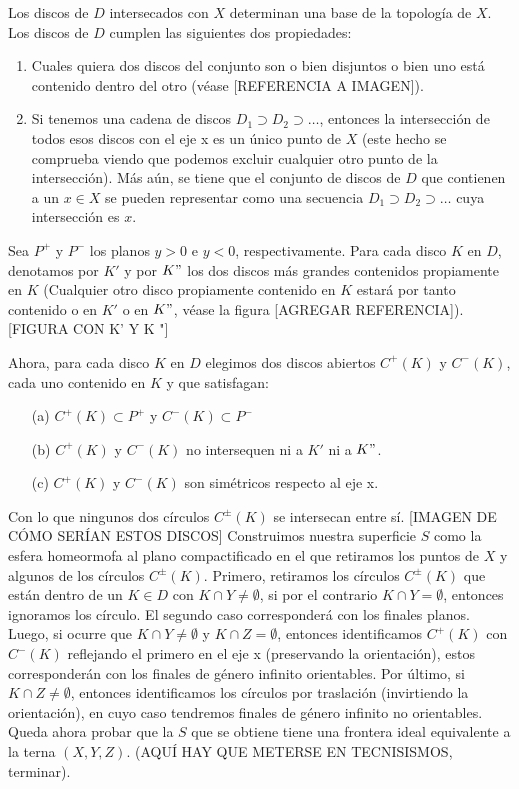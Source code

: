 \documentclass[a4paper,11pt,spanish, twoside, leqno]{tfg-uam}
\theoremstyle{definition}
\begin{document}
Los discos de $D$ intersecados con $X$ determinan una base de la topología de $X$. Los discos de $D$ cumplen las siguientes dos propiedades:
\begin{enumerate}
\item Cuales quiera dos discos del conjunto son o bien disjuntos o bien uno está contenido dentro del otro (véase [REFERENCIA A IMAGEN]).
\item Si tenemos una cadena de discos $D_1 \supset D_2 \supset \ldots$, entonces la intersección de todos esos discos  con el eje x es un único punto de $X$ (este hecho se comprueba viendo que podemos excluir cualquier otro punto de la intersección). Más aún, se tiene que el conjunto de discos de $D$ que contienen a un $x \in X$ se pueden representar como una secuencia $D_1 \supset D_2 \supset \ldots$ cuya intersección es $x$.
\end{enumerate}
Sea $P^+$ y $P^-$ los planos $y > 0 $ e $y < 0$, respectivamente. Para cada disco $K$ en $D$, denotamos por $K'$ y por $K"$ los dos discos más grandes contenidos propiamente en $K$ (Cualquier otro disco propiamente contenido en $K$ estará por tanto contenido o en $K'$ o en $K"$, véase la figura [AGREGAR REFERENCIA]).
[FIGURA CON K' Y K "]

Ahora, para cada disco $K$ en $D$ elegimos dos discos abiertos $C^+(K)$ y $C^-(K)$, cada uno contenido en $K$  y que satisfagan:
\begin{enumerate}
\item[(a)] $C^+(K) \subset P^+$ y $C^-(K) \subset P^-$
\item[(b)] $C^+(K)$ y $C^-(K)$ no intersequen ni a $K'$ ni a $K"$.
\item[(c)] $C^+(K)$ y $C^-(K)$ son simétricos respecto al eje x.
\end{enumerate}
Con lo que ningunos dos círculos $C^\pm(K)$ se intersecan entre sí.
[IMAGEN DE CÓMO SERÍAN ESTOS DISCOS]
Construimos nuestra superficie $S$ como la esfera homeormofa al plano compactificado en el que retiramos los puntos de $X$ y algunos de los círculos $C^\pm(K)$. Primero, retiramos los círculos $C^\pm(K)$ que están dentro de un $K\in D$ con $K \cap Y \neq \emptyset$, si por el contrario  $K \cap Y = \emptyset$, entonces ignoramos los círculo. El segundo caso corresponderá con los finales planos. Luego,  si ocurre que $K \cap Y \neq \emptyset$  y $K \cap Z = \emptyset$, entonces identificamos $C^+(K)$ con $C^-(K)$ reflejando el primero en el eje x (preservando la orientación), estos corresponderán con los finales de género infinito orientables.  Por último, si $K \cap Z \neq \emptyset$, entonces identificamos los círculos por traslación (invirtiendo la orientación), en cuyo caso tendremos finales de género infinito no orientables.\\
Queda ahora probar que la $S$ que se obtiene tiene una frontera ideal equivalente a la terna $(X,Y,Z)$. (AQUÍ HAY QUE METERSE EN TECNISISMOS, terminar).
\end{document}

